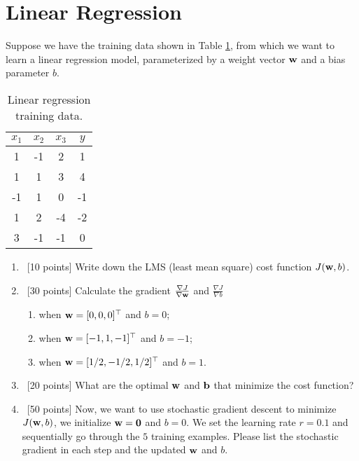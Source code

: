 \documentclass[12pt, fullpage,letterpaper]{article}
\begin{document}
\section{Linear Regression}
Suppose we have the training data shown in Table \ref{tb:1}, from which we want to learn a linear regression model, parameterized by a weight vector ${\bf w}$ and a bias parameter $b$.  
\begin{table}
        \centering
        \begin{tabular}{ccc|c}
        $x_1 $ & $x_2$ & $x_3$ &  $y$\\ 
        \hline\hline
         1 & -1 & 2 & 1 \\ \hline
         1 & 1 & 3 & 4 \\ \hline
         -1 & 1 & 0 & -1 \\ \hline
         1 & 2 & -4 & -2 \\ \hline
         3 & -1 & -1 & 0\\ \hline
         \end{tabular}
         \caption{Linear regression training data.}\label{tb:1}
\end{table}

\begin{enumerate}
\item~[10 points] Write down the LMS (least mean square) cost function $J({\bf w}, b)$. 
\item~[30 points] Calculate the gradient $\frac{\nabla J}{\nabla {\bf w}}$ and $\frac{\nabla J}{\nabla b}$ 
\begin{enumerate}
\item when ${\bf w} = [0,0,0]^\top$ and $b = 0$;
\item when ${\bf w} = [-1,1,-1]^\top$ and $b = -1$;
\item when ${\bf w} = [1/2,-1/2,1/2]^\top$ and $b = 1$.
\end{enumerate}
\item~[20 points] What are the optimal ${\bf w}$ and ${\bf b}$ that minimize the cost function? 
\item~[50 points] Now, we want to use stochastic gradient descent to minimize $J({\bf w}, b)$, we initialize ${\bf w} = {\bf 0}$ and $b = 0$. We set the learning rate $r = 0.1$ and sequentially go through the $5$ training examples. Please list the stochastic gradient in each step and the updated ${\bf w}$ and $b$.  
\end{enumerate}
\end{document}
